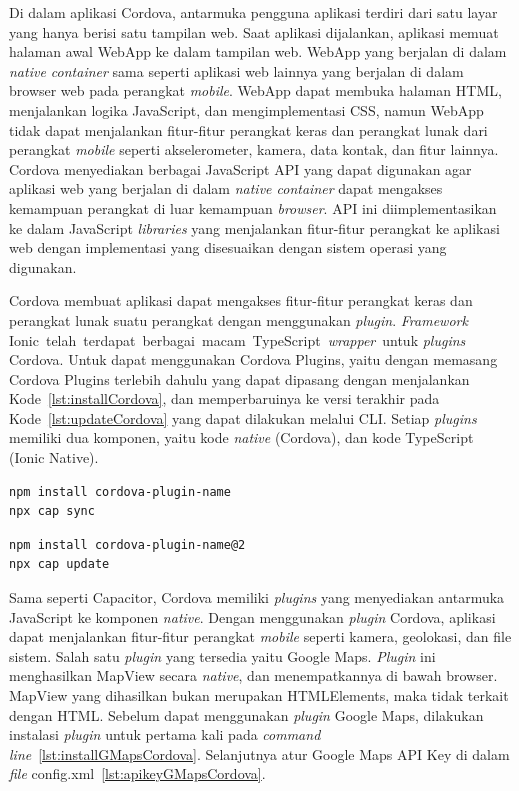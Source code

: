 Di dalam aplikasi Cordova, antarmuka pengguna aplikasi terdiri dari satu layar yang hanya berisi satu tampilan web. Saat aplikasi dijalankan, aplikasi memuat halaman awal WebApp ke dalam tampilan web. WebApp yang berjalan di dalam \textit{native container} sama seperti aplikasi web lainnya yang berjalan di dalam browser web pada perangkat \textit{mobile}. WebApp dapat membuka halaman HTML, menjalankan logika JavaScript, dan mengimplementasi CSS, namun WebApp tidak dapat menjalankan fitur-fitur perangkat keras dan perangkat lunak dari perangkat \textit{mobile} seperti akselerometer, kamera, data kontak, dan fitur lainnya. Cordova menyediakan berbagai JavaScript API yang dapat digunakan agar aplikasi web yang berjalan di dalam \textit{native container} dapat mengakses kemampuan perangkat di luar kemampuan \textit{browser}. API ini diimplementasikan ke dalam JavaScript \textit{libraries} yang menjalankan fitur-fitur perangkat ke aplikasi web dengan implementasi yang disesuaikan dengan sistem operasi yang digunakan.

Cordova membuat aplikasi dapat mengakses fitur-fitur perangkat keras dan perangkat lunak suatu perangkat dengan menggunakan {\it plugin}. {\it Framework} Ionic~telah~terdapat~berbagai~macam~TypeScript~{\it wrapper}~untuk {\it plugins} Cordova.  Untuk dapat menggunakan Cordova Plugins, yaitu dengan memasang Cordova Plugins terlebih dahulu yang dapat dipasang dengan menjalankan Kode~\ref{lst:installCordova}, dan memperbaruinya ke versi terakhir pada Kode~\ref{lst:updateCordova} yang dapat dilakukan melalui CLI. Setiap {\it plugins} memiliki dua komponen, yaitu kode {\it native} (Cordova), dan kode TypeScript (Ionic Native).

\begin{lstlisting}[label={lst:installCordova}, caption=Kode untuk Memasang Cordova Plugins]
npm install cordova-plugin-name
npx cap sync
\end{lstlisting} 

\begin{lstlisting}[label={lst:updateCordova}, caption=Kode untuk Memperbarui Cordova Plugins]
npm install cordova-plugin-name@2
npx cap update
\end{lstlisting} 

\newpage

Sama seperti Capacitor, Cordova memiliki \textit{plugins} yang menyediakan antarmuka JavaScript ke komponen \textit{native}. Dengan menggunakan \textit{plugin} Cordova, aplikasi dapat menjalankan fitur-fitur perangkat \textit{mobile} seperti kamera,	geolokasi, dan file sistem. Salah satu \textit{plugin} yang tersedia yaitu Google Maps. \textit{Plugin} ini menghasilkan MapView secara \textit{native}, dan menempatkannya di bawah browser. MapView yang dihasilkan bukan merupakan HTMLElements, maka tidak terkait dengan HTML. Sebelum dapat menggunakan \textit{plugin} Google Maps, dilakukan instalasi \textit{plugin} untuk pertama kali pada \textit{command line}~\ref{lst:installGMapsCordova}. Selanjutnya atur Google Maps API Key di dalam \textit{file} config.xml~\ref{lst:apikeyGMapsCordova}. 

